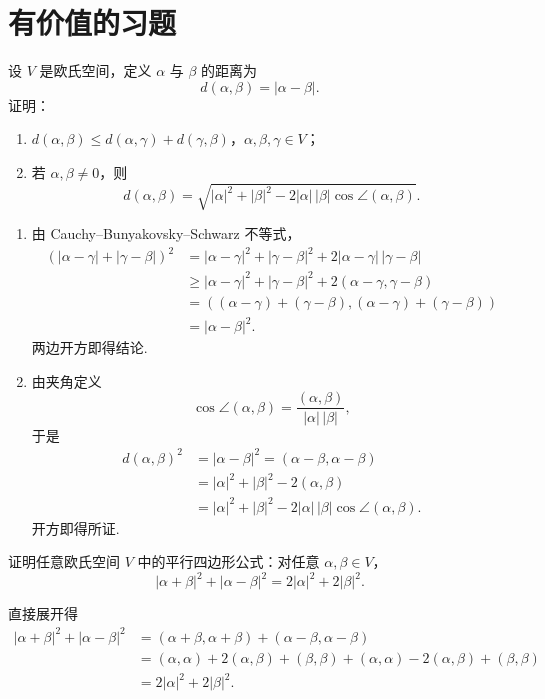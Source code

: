 \section{有价值的习题}

\begin{problem}
	设 $V$ 是欧氏空间，定义 $\alpha$ 与 $\beta$ 的距离为
	\[
	d(\alpha,\beta)=|\alpha-\beta|.
	\]
	证明：
	\begin{enumerate}
		\item $d(\alpha,\beta)\leqslant d(\alpha,\gamma)+d(\gamma,\beta)$，$\alpha,\beta,\gamma\in V$；
		\item 若 $\alpha,\beta\ne0$，则
		\[
		d(\alpha,\beta)
		=\sqrt{|\alpha|^2+|\beta|^2-2|\alpha|\,|\beta|\cos\angle(\alpha,\beta)}.
		\]
	\end{enumerate}
\end{problem}
\begin{solution}
	\begin{enumerate}
		\item 由 Cauchy--Bunyakovsky--Schwarz 不等式，
		\[
		\begin{aligned}
			(|\alpha-\gamma|+|\gamma-\beta|)^2
			&=|\alpha-\gamma|^2+|\gamma-\beta|^2
			+2|\alpha-\gamma|\,|\gamma-\beta| \\
			&\geqslant |\alpha-\gamma|^2+|\gamma-\beta|^2
			+2(\alpha-\gamma,\gamma-\beta) \\
			&=((\alpha-\gamma)+(\gamma-\beta),(\alpha-\gamma)+(\gamma-\beta)) \\
			&=|\alpha-\beta|^2.
		\end{aligned}
		\]
		两边开方即得结论.
		\item 由夹角定义
		\[
		\cos\angle(\alpha,\beta)=\frac{(\alpha,\beta)}{|\alpha|\,|\beta|},
		\]
		于是
		\[
		\begin{aligned}
			d(\alpha,\beta)^2
			&=|\alpha-\beta|^2
			=(\alpha-\beta,\alpha-\beta) \\
			&=|\alpha|^2+|\beta|^2-2(\alpha,\beta) \\
			&=|\alpha|^2+|\beta|^2-2|\alpha|\,|\beta|\cos\angle(\alpha,\beta).
		\end{aligned}
		\]
		开方即得所证.
	\end{enumerate}
\end{solution}

\begin{problem}

	证明任意欧氏空间 $V$ 中的平行四边形公式：对任意 $\alpha,\beta\in V$，
	\[
	|\alpha+\beta|^2+|\alpha-\beta|^2=2|\alpha|^2+2|\beta|^2.
	\]
\end{problem}
\begin{solution}
	直接展开得
	\[
	\begin{aligned}
		|\alpha+\beta|^2+|\alpha-\beta|^2
		&=(\alpha+\beta,\alpha+\beta)+(\alpha-\beta,\alpha-\beta) \\
		&=(\alpha,\alpha)+2(\alpha,\beta)+(\beta,\beta)
		+(\alpha,\alpha)-2(\alpha,\beta)+(\beta,\beta) \\
		&=2|\alpha|^2+2|\beta|^2.
	\end{aligned}
	\]
\end{solution}

